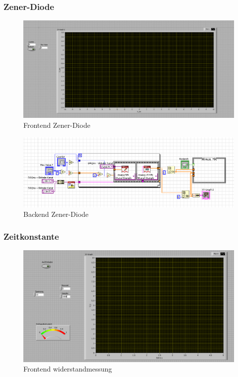 \documentclass[12pt,twoside,a4paper]{scrartcl}
\begin{document}
		\subsubsection{Zener-Diode}
			\label{Programme::Z}
		\begin{figure}[H]
			\centering
			\includegraphics[width =  \textwidth]{Pictures/Programme/Frontend_Zener}
			\caption{Frontend Zener-Diode}
		\end{figure}

			\begin{figure}[H]
				\centering
				\includegraphics[width =  \textwidth]{Pictures/Programme/Backend_Zener}
				\caption{Backend Zener-Diode}
			\end{figure}

		\subsubsection{Zeitkonstante}
			\label{Programme::Kondensator}

			\begin{figure}[H]
				\centering
				\includegraphics[width =  \textwidth]{Pictures/Programme/Frontend_Capacitor}
				\caption{Frontend widerstandmessung}
			\end{figure}
\end{document}
